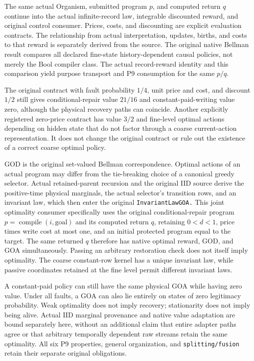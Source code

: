 \documentclass[
  english,
  11pt,
  oneside]{book}
\begin{document}
The same actual Organism, submitted program \(p\), and computed return \(q\) continue into the actual infinite-record law, integrable discounted reward, and original control consumer. Prices, costs, and discounting are explicit evaluation contracts. The relationship from actual interpretation, updates, births, and costs to that reward is separately derived from the source. The original native Bellman result compares all declared fine-state history-dependent causal policies, not merely the Bool compiler class. The actual record-reward identity and this comparison yield purpose transport and P9 consumption for the same \(p/q\).

The original contract with fault probability \(1/4\), unit price and cost, and discount \(1/2\) still gives conditional-repair value \(21/16\) and constant-paid-writing value zero, although the physical recovery paths can coincide. Another explicitly registered zero-price contract has value \(3/2\) and fine-level optimal actions depending on hidden state that do not factor through a coarse current-action representation. It does not change the original contract or rule out the existence of a correct coarse optimal policy.

GOD is the original set-valued Bellman correspondence. Optimal actions of an actual program may differ from the tie-breaking choice of a canonical greedy selector. Actual retained-parent recursion and the original IID source derive the positive-time physical marginals, the actual selector's transition rows, and an invariant law, which then enter the original \nolinkurl{InvariantLawGOA.} This joint optimality consumer specifically uses the original conditional-repair program \(p=\operatorname{compile}(i,\mathrm{goal})\) and its computed return \(q\), retaining \(0<d<1\), price times write cost at most one, and an initial protected program equal to the target. The same returned \(q\) therefore has native optimal reward, GOD, and GOA simultaneously. Passing an arbitrary restoration check does not itself imply optimality. The coarse constant-row kernel has a unique invariant law, while passive coordinates retained at the fine level permit different invariant laws.

A constant-paid policy can still have the same physical GOA while having zero value. Under all faults, a GOA can also lie entirely on states of zero legitimacy probability. Weak optimality does not imply recovery; stationarity does not imply being alive. Actual IID marginal provenance and native value adaptation are bound separately here, without an additional claim that entire adapter paths agree or that arbitrary temporally dependent raw streams retain the same optimality. All six P9 properties, general organization, and \nolinkurl{splitting/fusion} retain their separate original obligations.
\end{document}
